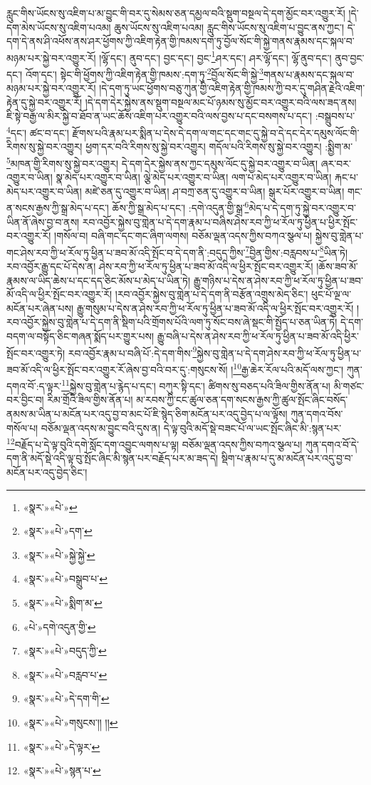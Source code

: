 རླུང་གིས་ཡོངས་སུ་འཇིག་པ་མ་བྱུང་གི་བར་དུ་སེམས་ཅན་དམྱལ་བའི་སྡུག་བསྔལ་དེ་དག་མྱོང་བར་འགྱུར་རོ། །དེ་དག་མེས་ཡོངས་སུ་འཇིག་པའམ། ཆུས་ཡོངས་སུ་འཇིག་པའམ། རླུང་གིས་ཡོངས་སུ་འཇིག་པ་བྱུང་ནས་ཀྱང་། དེ་དག་དེ་ནས་ཤི་འཕོས་ནས་ཤར་ཕྱོགས་ཀྱི་འཇིག་རྟེན་གྱི་ཁམས་དག་ཏུ་བྱོལ་སོང་གི་སྐྱེ་གནས་རྣམས་དང་སྐལ་བ་མཉམ་པར་སྐྱེ་བར་འགྱུར་རོ། །ལྷོ་དང་། ནུབ་དང་། བྱང་དང་། བྱང་\footnote{«སྣར་»«པེ་»}ཤར་དང་། ཤར་ལྷོ་དང་། ལྷོ་ནུབ་དང་། ནུབ་བྱང་དང་། འོག་དང་། སྟེང་གི་ཕྱོགས་ཀྱི་འཇིག་རྟེན་གྱི་ཁམས་:དག་ཏུ་\footnote{«སྣར་»«པེ་»དག་}བྱོལ་སོང་གི་སྐྱེ་\footnote{«སྣར་»«པེ་»སྐྱེ་སྐྱེ་}གནས་པ་རྣམས་དང་སྐལ་བ་མཉམ་པར་སྐྱེ་བར་འགྱུར་རོ། །དེ་དག་ཏུ་ཡང་ཕྱོགས་བཅུ་ཀུན་གྱི་འཇིག་རྟེན་གྱི་ཁམས་ཀྱི་བར་དུ་གཤིན་རྗེའི་འཇིག་རྟེན་དུ་སྐྱེ་བར་འགྱུར་རོ། །དེ་དག་དེར་སྐྱེས་ནས་སྡུག་བསྔལ་མང་པོ་ཉམས་སུ་མྱོང་བར་འགྱུར་བའི་ལས་ཟད་ནས། ཇི་སྟེ་བརྒྱ་ལ་མིར་སྐྱེ་བ་ཐོབ་ན་ཡང་ཆོས་འཇིག་པར་འགྱུར་བའི་ལས་བྱས་པ་དང་བསགས་པ་དང་། :བསྒྲུབས་པ་\footnote{«སྣར་»«པེ་»བསྒྲུབ་པ་}དང་། ཚང་བ་དང་། རྫོགས་པའི་རྣམ་པར་སྨིན་པ་དེས་དེ་དག་ལ་གང་དང་གང་དུ་སྐྱེ་བ་དེ་དང་དེར་དམུས་ལོང་གི་རིགས་སུ་སྐྱེ་བར་འགྱུར། ཕྱག་དར་བའི་རིགས་སུ་སྐྱེ་བར་འགྱུར། གདོལ་པའི་རིགས་སུ་སྐྱེ་བར་འགྱུར། :སྨྱིག་མ་\footnote{«སྣར་»«པེ་»སྨིག་མ་}མཁན་གྱི་རིགས་སུ་སྐྱེ་བར་འགྱུར། དེ་དག་དེར་སྐྱེས་ནས་ཀྱང་དམུས་ལོང་དུ་སྐྱེ་བར་འགྱུར་བ་ཡིན། ཞར་བར་འགྱུར་བ་ཡིན། སྣ་མེད་པར་འགྱུར་བ་ཡིན། ལྕེ་མེད་པར་འགྱུར་བ་ཡིན། ལག་པ་མེད་པར་འགྱུར་བ་ཡིན། རྐང་པ་མེད་པར་འགྱུར་བ་ཡིན། མཛེ་ཅན་དུ་འགྱུར་བ་ཡིན། ཤ་བཀྲ་ཅན་དུ་འགྱུར་བ་ཡིན། སྒུར་པོར་འགྱུར་བ་ཡིན། གང་ན་སངས་རྒྱས་ཀྱི་སྒྲ་མེད་པ་དང་། ཆོས་ཀྱི་སྒྲ་མེད་པ་དང་། :དགེ་འདུན་གྱི་སྒྲ་\footnote{«པེ་»དགེ་འདུན་གྱི་}མེད་པ་དེ་དག་ཏུ་སྐྱེ་བར་འགྱུར་བ་ཡིན་ནོ་ཞེས་བྱ་བ་ནས། རབ་འབྱོར་སྐྱེས་བུ་གླེན་པ་དེ་དག་རྣམ་པ་བཞིས་ཤེས་རབ་ཀྱི་ཕ་རོལ་ཏུ་ཕྱིན་པ་ཕྱིར་སྤོང་བར་འགྱུར་རོ། །གསོལ་བ། བཞི་གང་དང་གང་ཞིག་ལགས། བཅོམ་ལྡན་འདས་ཀྱིས་བཀའ་སྩལ་པ། སྐྱེས་བུ་གླེན་པ་གང་ཤེས་རབ་ཀྱི་ཕ་རོལ་ཏུ་ཕྱིན་པ་ཟབ་མོ་འདི་སྤོང་བ་དེ་དག་ནི་:བདུད་ཀྱིས་\footnote{«སྣར་»«པེ་»བདུད་ཀྱི་}བྱིན་གྱིས་:བརླབས་པ་\footnote{«སྣར་»«པེ་»བརླབ་པ་}ཡིན་ཏེ། རབ་འབྱོར་རྒྱུ་དང་པོ་དེས་ན། ཤེས་རབ་ཀྱི་ཕ་རོལ་ཏུ་ཕྱིན་པ་ཟབ་མོ་འདི་ལ་ཕྱིར་སྤོང་བར་འགྱུར་རོ། །ཆོས་ཟབ་མོ་རྣམས་ལ་ཡིད་ཆེས་པ་དང་དད་ཅིང་མོས་པ་མེད་པ་ཡིན་ཏེ། རྒྱུ་གཉིས་པ་དེས་ན་ཤེས་རབ་ཀྱི་ཕ་རོལ་ཏུ་ཕྱིན་པ་ཟབ་མོ་འདི་ལ་ཕྱིར་སྤོང་བར་འགྱུར་རོ། །རབ་འབྱོར་སྐྱེས་བུ་གླེན་པ་དེ་དག་ནི་བརྩོན་འགྲུས་མེད་ཅིང་། ཕུང་པོ་ལྔ་ལ་མངོན་པར་ཞེན་པས། རྒྱུ་གསུམ་པ་དེས་ན་ཤེས་རབ་ཀྱི་ཕ་རོལ་ཏུ་ཕྱིན་པ་ཟབ་མོ་འདི་ལ་ཕྱིར་སྤོང་བར་འགྱུར་རོ། །རབ་འབྱོར་སྐྱེས་བུ་གླེན་པ་དེ་དག་ནི་སྡིག་པའི་གྲོགས་པོའི་ལག་ཏུ་སོང་བས་ཞེ་སྡང་གི་སྤྱོད་པ་ཅན་ཡིན་ཏེ། དེ་དག་བདག་ལ་བསྟོད་ཅིང་གཞན་སྨོད་པར་གྱུར་པས། རྒྱུ་བཞི་པ་དེས་ན་ཤེས་རབ་ཀྱི་ཕ་རོལ་ཏུ་ཕྱིན་པ་ཟབ་མོ་འདི་ཕྱིར་སྤོང་བར་འགྱུར་ཏེ། རབ་འབྱོར་རྣམ་པ་བཞི་པོ་:དེ་དག་གིས་\footnote{«སྣར་»«པེ་»དེ་དག་གི་}སྐྱེས་བུ་གླེན་པ་དེ་དག་ཤེས་རབ་ཀྱི་ཕ་རོལ་ཏུ་ཕྱིན་པ་ཟབ་མོ་འདི་ལ་ཕྱིར་སྤོང་བར་འགྱུར་རོ་ཞེས་བྱ་བའི་བར་དུ་:གསུངས་སོ། །\footnote{«སྣར་»«པེ་»གསུངས་།། །།}རྒྱ་ཆེར་རོལ་པའི་མདོ་ལས་ཀྱང་། ཀུན་དགའ་བོ་:ད་ལྟར་\footnote{«སྣར་»«པེ་»དེ་ལྟར་}སྐྱེས་བུ་གླེན་པ་རྙེད་པ་དང་། བཀུར་སྟི་དང་། ཚིགས་སུ་བཅད་པའི་ཟིལ་གྱིས་ནོན་པ། མི་གཙང་བར་བྱིང་བ། རིམ་གྲོའི་ཟིལ་གྱིས་ནོན་པ། མ་རབས་ཀྱི་ངང་ཚུལ་ཅན་དག་སངས་རྒྱས་ཀྱི་ཚུལ་སྤོང་ཞིང་བསོད་ནམས་མ་ཡིན་པ་མངོན་པར་འདུ་བྱ་བ་མང་པོ་ཇི་སྙེད་ཅིག་མངོན་པར་འདུ་བྱེད་པ་ལ་ལྟོས། ཀུན་དགའ་བོས་གསོལ་པ། བཅོམ་ལྡན་འདས་མ་བྱུང་བའི་དུས་ན། དེ་ལྟ་བུའི་མདོ་སྡེ་བཟང་པོ་ལ་ཡང་སྤོང་ཞིང་མི་:སྙན་པར་\footnote{«སྣར་»«པེ་»སྙན་པ་}བརྗོད་པ་དེ་ལྟ་བུའི་དགེ་སློང་དག་འབྱུང་ལགས་པ་ལྟ། བཅོམ་ལྡན་འདས་ཀྱིས་བཀའ་སྩལ་པ། ཀུན་དགའ་བོ་དེ་དག་ནི་མདོ་སྡེ་འདི་ལྟ་བུ་སྤོང་ཞིང་མི་སྙན་པར་བརྗོད་པར་མ་ཟད་དེ། སྡིག་པ་རྣམ་པ་དུ་མ་མངོན་པར་འདུ་བྱ་བ་མངོན་པར་འདུ་བྱེད་ཅིང་། 